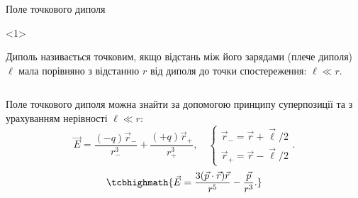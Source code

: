 \documentclass{beamer}
\begin{document}
\begin{frame}{Поле точкового диполя}
	\begin{onlyenv}
		\begin{block}{}\justifying
			Диполь називається \alert{точковим}, якщо відстань між його зарядами
			(плече диполя) $\ell$ мала порівняно з відстанню $r$ від диполя до
			точки спостереження: $\ell \ll r$.
		\end{block}

		\begin{columns}
			\begin{column}{0.75\linewidth}
				\begin{block}{}\justifying\small
					Поле точкового диполя можна знайти за допомогою принципу
					суперпозиції
					та з урахуванням нерівності $\ell \ll r$:
					\begin{equation*}
						\vec{E} = \frac{(-q)\vec{r}_-}{r_-^3} +
						\frac{(+q)\vec{r}_+}{r_+^3}, \quad
						\begin{cases}
							\vec{r}_- =  \vec{r} + \vec{\ell}/2 \\
							\vec{r}_+ =  \vec{r} - \vec{\ell}/2
						\end{cases}.
					\end{equation*}
					\begin{equation*}
						\tcbhighmath{
							\vec{E} = \frac{3(\vec{p}\cdot\vec{r})\vec{r}}{r^5} -
							\frac{\vec{p}}{r^3}.
						}
					\end{equation*}


\end{block}
\end{column}
\end{columns}
\end{onlyenv}
\end{frame}
\end{document}

